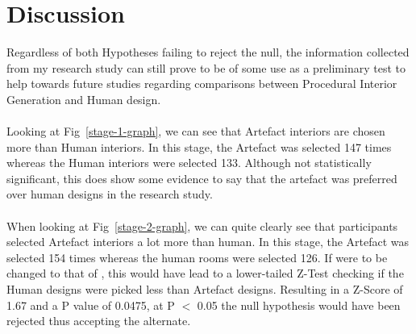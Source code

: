 \section{Discussion}
Regardless of both Hypotheses failing to reject the null, the information collected from my research study can still prove to be of some use as a preliminary test to help towards future studies regarding comparisons between Procedural Interior Generation and Human design.
\\
\\
Looking at Fig~\ref{stage-1-graph}, we can see that Artefact interiors are chosen more than Human interiors. In this stage, the Artefact was selected 147 times whereas the Human interiors were selected 133. Although not statistically significant, this does show some evidence to say that the artefact was preferred over human designs in the research study.
\\
\\
When looking at Fig~\ref{stage-2-graph}, we can quite clearly see that participants selected Artefact interiors a lot more than human. In this stage, the Artefact was selected 154 times whereas the human rooms were selected 126. If  were to be changed to that of , this would have lead to a lower-tailed Z-Test checking if the Human designs were picked less than Artefact designs. Resulting in a Z-Score of 1.67 and a P value of 0.0475, at P $<$ 0.05 the null hypothesis would have been rejected thus accepting the alternate.